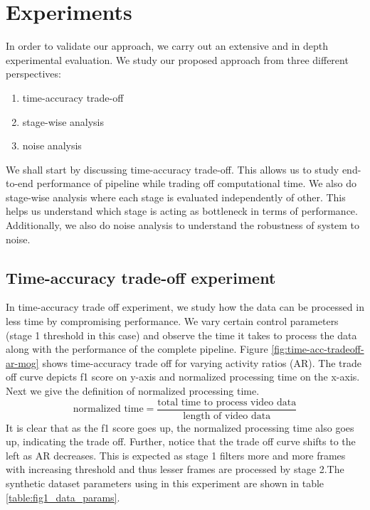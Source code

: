 \section{Experiments}
In order to validate our approach, we carry out an extensive and in depth experimental evaluation.  We study our proposed approach from three different perspectives: 

\begin{enumerate}
\item time-accuracy trade-off
\item stage-wise analysis
\item noise analysis
\end{enumerate}

We shall start by discussing time-accuracy trade-off. This allows us to study end-to-end performance of pipeline while trading off computational time.  We also do stage-wise analysis where each stage is evaluated independently of other. This helps us understand which stage is acting as bottleneck in terms of performance. Additionally, we also do noise analysis to understand the robustness of system to noise.

\subsection{Time-accuracy trade-off experiment}
In time-accuracy trade off experiment, we study how the data can be processed in less time by compromising performance. We vary certain control parameters (stage 1 threshold in this case) and observe the time it takes to process the data along with the performance of the complete pipeline. Figure \ref{fig:time-acc-tradeoff-ar-mog} shows time-accuracy trade off for varying activity ratios (AR). The trade off curve depicts f1 score on y-axis and normalized processing time on the x-axis. Next we give the definition of normalized processing time. 
$$\text{normalized time} = \frac{\text{total time to process video data}}{\text{length of video data}}$$
It is clear that as the f1 score goes up, the normalized processing time also goes up, indicating the trade off. Further, notice that the trade off curve shifts to the left as AR decreases. This is expected as stage 1 filters more and more frames with increasing threshold and thus lesser frames are processed by stage 2.The synthetic dataset parameters using in this experiment are shown in table \ref{table:fig1_data_params}. 

